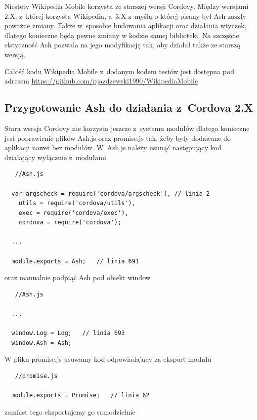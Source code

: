 \documentclass[brudnopis]{xmgr}
\begin{document}
Niestety Wikipedia Mobile korzysta ze starszej wersji Cordovy. Między wersjami 2.X, z~której korzysta Wikipedia, a~3.X z~myślą o której pisany był Ash zaszły poważne zmiany. Także w~sposobie budowania aplikacji oraz działania wtyczek, dlatego konieczne będą pewne zmiany w kodzie samej biblioteki. Na szczęście elstyczność Ash pozwala na jego modyfikację tak, aby działał także ze starszą wersją.

Całość kodu Wikipedia Mobile z~dodanym kodem testów jest dostępna pod adresem \url{https://github.com/pjazdzewski1990/WikipediaMobile} 

\subsection{Przygotowanie Ash do działania z~Cordova 2.X}
  
Stara wersja Cordovy nie korzysta jeszcze z~systemu modułów dlatego konieczne jest poprawienie plików Ash.js oraz promise.js tak, żeby były dodawane do aplikacji nawet bez modułów.  W~Ash.js należy usunąć następujący kod działający wyłącznie z~modułami

\begin{lstlisting}
   //Ash.js
  
  var argscheck = require('cordova/argscheck'), // linia 2
    utils = require('cordova/utils'),
    exec = require('cordova/exec'),
    cordova = require('cordova');

  ...

  module.exports = Ash;   // linia 691

\end{lstlisting}

oraz manualnie podpiąć Ash pod obiekt window

\begin{lstlisting}
   //Ash.js

  ...

  window.Log = Log;   // linia 693
  window.Ash = Ash;

\end{lstlisting}

W pliku promise.js usuwamy kod odpowiadający za eksport modułu

\begin{lstlisting}
   //promise.js
 
  module.exports = Promise;   // linia 62 

\end{lstlisting}

zamiast tego eksportujemy go samodzielnie 
\end{document}
